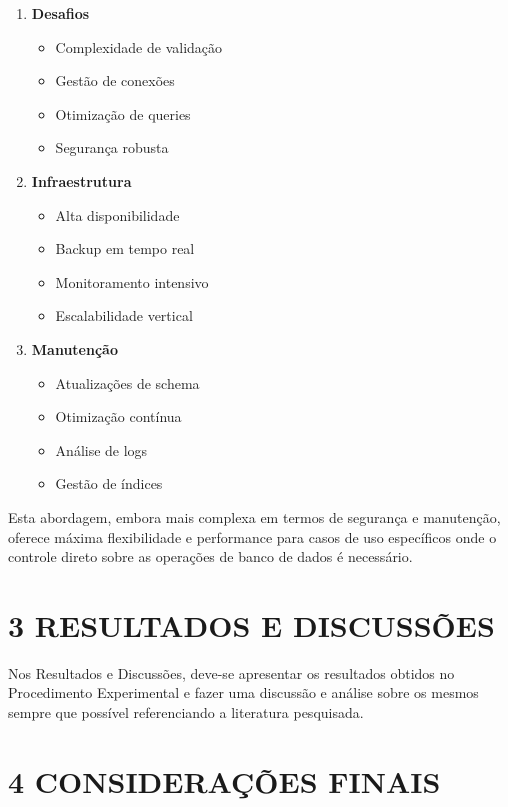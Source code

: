 \documentclass[
]{article}
\providecommand{\tightlist}{%
  \setlength{\itemsep}{0pt}\setlength{\parskip}{0pt}}
\begin{document}
\begin{enumerate}
\def\labelenumi{\arabic{enumi}.}
\item
  \textbf{Desafios}

  \begin{itemize}
  \tightlist
  \item
    Complexidade de validação
  \item
    Gestão de conexões
  \item
    Otimização de queries
  \item
    Segurança robusta
  \end{itemize}
\item
  \textbf{Infraestrutura}

  \begin{itemize}
  \tightlist
  \item
    Alta disponibilidade
  \item
    Backup em tempo real
  \item
    Monitoramento intensivo
  \item
    Escalabilidade vertical
  \end{itemize}
\item
  \textbf{Manutenção}

  \begin{itemize}
  \tightlist
  \item
    Atualizações de schema
  \item
    Otimização contínua
  \item
    Análise de logs
  \item
    Gestão de índices
  \end{itemize}
\end{enumerate}

Esta abordagem, embora mais complexa em termos de segurança e
manutenção, oferece máxima flexibilidade e performance para casos de uso
específicos onde o controle direto sobre as operações de banco de dados
é necessário.

\section{3 RESULTADOS E DISCUSSÕES}\label{resultados-e-discussuxf5es}

Nos Resultados e Discussões, deve-se apresentar os resultados obtidos no
Procedimento Experimental e fazer uma discussão e análise sobre os
mesmos sempre que possível referenciando a literatura pesquisada.

\section{4 CONSIDERAÇÕES FINAIS}\label{considerauxe7uxf5es-finais}
\end{document}
